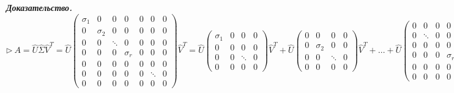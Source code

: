 \vspace{\baselineskip}
\textbf{\textit{Доказательство.}} $\rhd \ A = \hat{U} \hat{\Sigma} \hat{V}^T = \hat{U} \begin{pmatrix} \sigma_1 & 0 & 0 & 0 & 0 & 0 & 0 \\  0 & \sigma_2 & 0 & 0 & 0 & 0 & 0 \\ 0 & 0 & \ddots & 0 & 0 & 0 & 0 \\ 0 & 0 & 0 & \sigma_r & 0 & 0 & 0 \\ 0 & 0 & 0 & 0 & 0 & 0 & 0 \\ 0 & 0 & 0 & 0 & 0 & \ddots & 0 \\ 0 & 0 & 0 & 0 & 0 & 0 & 0 \end{pmatrix} \hat{V}^T = \hat{U} \begin{pmatrix} \sigma_1 & 0 & 0 & 0 \\  0 & 0 & 0 & 0 \\ 0 & 0 & \ddots & 0 \\ 0 & 0 & 0 & 0 \end{pmatrix} \hat{V}^T + \hat{U} \begin{pmatrix} 0 & 0 & 0 & 0 \\  0 & \sigma_2 & 0 & 0 \\ 0 & 0 & \ddots & 0 \\ 0 & 0 & 0 & 0 \end{pmatrix} \hat{V}^T + \dots + \hat{U} \begin{pmatrix} 0 & 0 & 0 & 0 & 0 & 0 \\  0 & \ddots & 0 & 0 & 0 & 0\\ 0 & 0 & 0 & 0 & 0 & 0 \\ 0 & 0 & 0 & \sigma_r & 0 & 0 \\ 0 & 0 & 0 & 0 & \ddots & 0 \\ 0 & 0 & 0 & 0 & 0 & 0 \end{pmatrix} \hat{V}^T = \hat{U} \begin{pmatrix} \sigma_1 v_1^T \\ 0 \\ \vdots \\ 0 \end{pmatrix} + \hat{U} \begin{pmatrix} 0 \\ \sigma_2 v_2^T \\ \vdots \\ 0 \end{pmatrix} + \dots + \hat{U} \begin{pmatrix} 0 \\ \vdots \\ 0 \\ \sigma_r v_r^T \\ 0 \\ \vdots \\ 0 \end{pmatrix} = u_1 \sigma_1 v_1^T + u_2 \sigma_2 v_2^T + \dots + u_r \sigma_r v_r^T \ \lhd$

